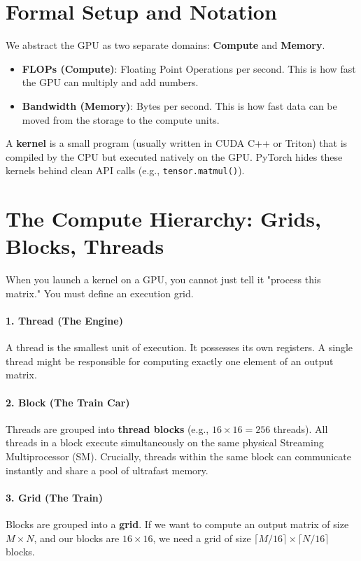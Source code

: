 \section{Formal Setup and Notation}
\label{ch:04:sec:setup}

We abstract the GPU as two separate domains: \textbf{Compute} and \textbf{Memory}.
\begin{itemize}
    \item \textbf{FLOPs (Compute)}: Floating Point Operations per second. This is how fast the GPU can multiply and add numbers.
    \item \textbf{Bandwidth (Memory)}: Bytes per second. This is how fast data can be moved from the storage to the compute units.
\end{itemize}

A \textbf{kernel} is a small program (usually written in CUDA C++ or Triton) that is compiled by the CPU but executed natively on the GPU. PyTorch hides these kernels behind clean API calls (e.g., \texttt{tensor.matmul()}).

\section{The Compute Hierarchy: Grids, Blocks, Threads}
\label{ch:04:sec:main}

When you launch a kernel on a GPU, you cannot just tell it "process this matrix." You must define an execution grid.

\paragraph{1. Thread (The Engine)}
A thread is the smallest unit of execution. It possesses its own registers. A single thread might be responsible for computing exactly one element of an output matrix.

\paragraph{2. Block (The Train Car)}
Threads are grouped into \textbf{thread blocks} (e.g., $16 \times 16 = 256$ threads). All threads in a block execute simultaneously on the same physical Streaming Multiprocessor (SM). Crucially, threads within the same block can communicate instantly and share a pool of ultrafast memory.

\paragraph{3. Grid (The Train)}
Blocks are grouped into a \textbf{grid}. If we want to compute an output matrix of size $M \times N$, and our blocks are $16 \times 16$, we need a grid of size $\lceil M/16 \rceil \times \lceil N/16 \rceil$ blocks. 

